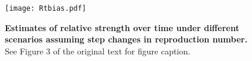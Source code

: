 \documentclass[12pt]{article}
\begin{document}
\setcounter{figure}{0}    
\renewcommand\thefigure{S\arabic{figure}}    

\begin{figure}[!pht]
\begin{center}
\texttt{[image: Rtbias.pdf]}
\caption{
\textbf{Estimates of relative strength over time under different scenarios assuming step changes in reproduction number.}
See Figure 3 of the original text for figure caption.
}
\end{center}
\end{figure}


\pagebreak


\end{document}
